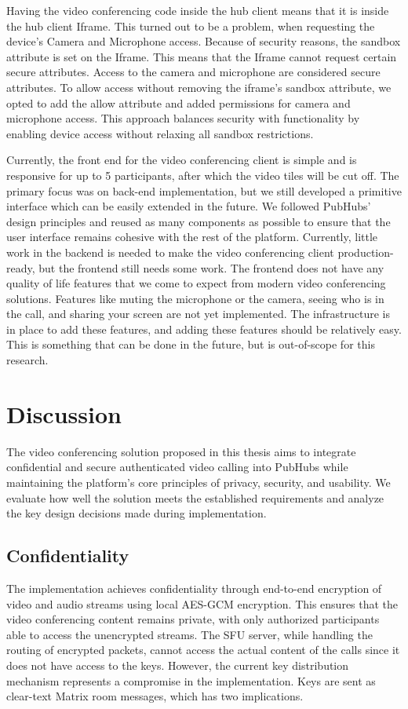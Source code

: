 \documentclass{report}
\begin{document}
Having the video conferencing code inside the hub client means that it is inside the hub client Iframe.
This turned out to be a problem, when requesting the device's Camera and Microphone access. Because of security reasons, the
sandbox attribute is set on the Iframe. This means that the Iframe cannot request certain secure attributes.
Access to the camera and microphone are considered secure attributes.
To allow access without removing the iframe’s sandbox attribute, we opted to add the allow attribute and added
permissions for camera and microphone access.
This approach balances security with functionality by enabling device access without relaxing all sandbox restrictions.

Currently, the front end for the video conferencing client is simple and is responsive for up to 5 participants, after which
the video tiles will be cut off.
The primary focus was on back-end implementation, but we still developed a primitive interface which can be easily
extended in the future.
We followed PubHubs’ design principles and reused as many components as possible to ensure that the user interface
remains cohesive with the rest of the platform. Currently, little work in the backend is needed to make the video
conferencing client production-ready, but the frontend still needs some work. The frontend does not have any quality
of life features that we come to expect from modern video conferencing solutions. Features like muting the
microphone or the camera, seeing who is in the call, and sharing your screen are not yet implemented. The
infrastructure is in place to add these features, and adding these features should be relatively easy. This is
something that can be done in the future, but is out-of-scope for this research.

\chapter{Discussion}
The video conferencing solution proposed in this thesis aims to integrate confidential and secure authenticated video
calling into PubHubs while maintaining the platform's core principles of privacy, security, and usability. We evaluate
how well the solution meets the established requirements and analyze the key design decisions made during
implementation.

\section{Confidentiality}
The implementation achieves confidentiality through end-to-end encryption of video and audio streams using local
AES-GCM encryption. This ensures that the video conferencing content remains private, with only authorized
participants able to access the unencrypted streams. The SFU server, while handling the routing of encrypted
packets, cannot access the actual content of the calls since it does not have access to the keys. However, the current
key distribution mechanism represents a compromise in the implementation. Keys are sent as
clear-text Matrix room messages, which has two implications.
\end{document}

